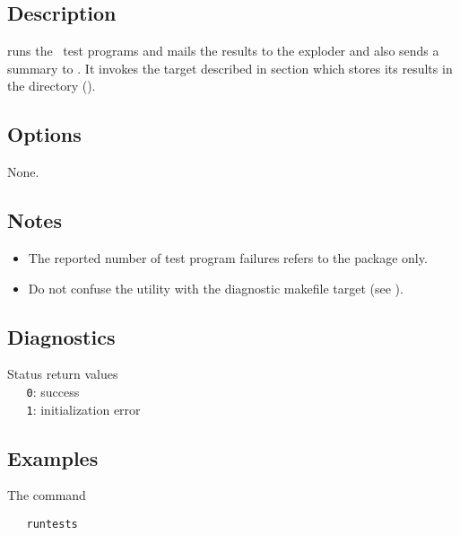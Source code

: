 \begin{synopsis}
\end{synopsis}
 
\subsection*{Description}
 
 runs the \aipspp\ test programs and mails the results to the
 exploder and also sends a summary to .
It invokes the  target described in section  which stores its results in the 
directory ().
 
\subsection*{Options}
 
None.
 
\subsection*{Notes}
 
\begin{itemize}
\item
   The reported number of test program failures refers to the 
   package only.

\item
   Do not confuse the  utility with the 
   diagnostic makefile target (see ).
\end{itemize}
 
\subsection*{Diagnostics}
 
Status return values
\\ \verb+   0+: success
\\ \verb+   1+: initialization error\\
 
\subsection*{Examples}
 
The command
 
\begin{verbatim}
   runtests
\end{verbatim}
 
